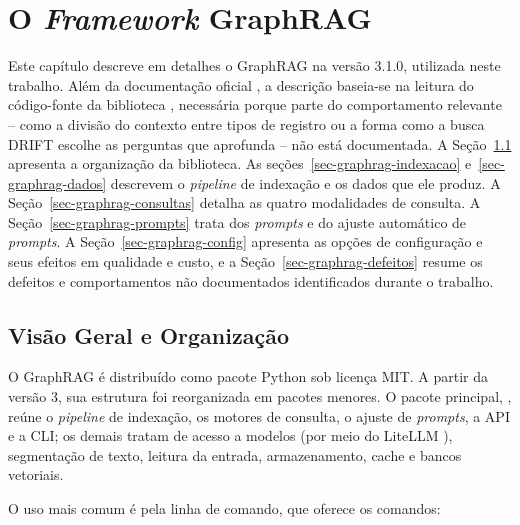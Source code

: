 \chapter{O \textit{Framework} GraphRAG}
\label{sec-graphrag}

Este capítulo descreve em detalhes o GraphRAG na versão 3.1.0, utilizada neste trabalho. Além da documentação oficial \cite{graphragdocs}, a descrição baseia-se na leitura do código-fonte da biblioteca \cite{graphraggithub}, necessária porque parte do comportamento relevante -- como a divisão do contexto entre tipos de registro ou a forma como a busca DRIFT escolhe as perguntas que aprofunda -- não está documentada. A Seção~\ref{sec-graphrag-visao} apresenta a organização da biblioteca. As seções~\ref{sec-graphrag-indexacao} e~\ref{sec-graphrag-dados} descrevem o \textit{pipeline} de indexação e os dados que ele produz. A Seção~\ref{sec-graphrag-consultas} detalha as quatro modalidades de consulta. A Seção~\ref{sec-graphrag-prompts} trata dos \textit{prompts} e do ajuste automático de \textit{prompts}. A Seção~\ref{sec-graphrag-config} apresenta as opções de configuração e seus efeitos em qualidade e custo, e a Seção~\ref{sec-graphrag-defeitos} resume os defeitos e comportamentos não documentados identificados durante o trabalho.

\section{Visão Geral e Organização}
\label{sec-graphrag-visao}

O GraphRAG é distribuído como pacote Python sob licença MIT. A partir da versão 3, sua estrutura foi reorganizada em pacotes menores. O pacote principal, , reúne o \textit{pipeline} de indexação, os motores de consulta, o ajuste de \textit{prompts}, a API e a CLI; os demais tratam de acesso a modelos (por meio do LiteLLM \cite{litellm}), segmentação de texto, leitura da entrada, armazenamento, cache e bancos vetoriais.

O uso mais comum é pela linha de comando, que oferece os comandos:

